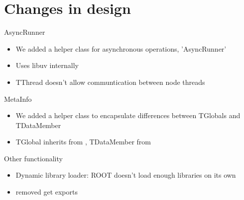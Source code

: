 \section{Changes in design}

\begin{frame}{AsyncRunner}
	\begin{itemize}
		\item We added a helper class for asynchronous operations, 'AsyncRunner'
		\item Uses libuv internally
		\item TThread doesn't allow communtication between node threads
	\end{itemize}
\end{frame}

\begin{frame}{MetaInfo}
	\begin{itemize}
		\item We added a helper class to encapsulate differences between TGlobals and TDataMember
		\item TGlobal inherits from , TDataMember from
	\end{itemize}
\end{frame}

\begin{frame}{Other functionality}
	\begin{itemize}
		\item Dynamic library loader: ROOT doesn't load enough libraries on its own
		\item removed get exports
	\end{itemize}
\end{frame}



